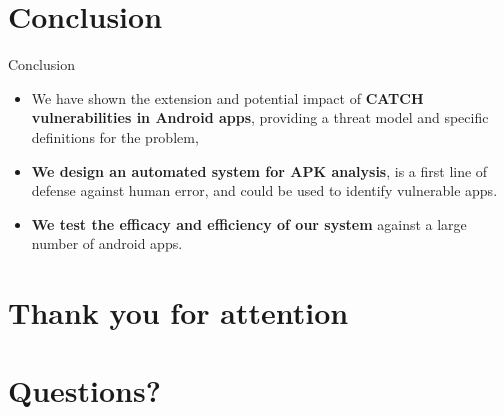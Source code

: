 \documentclass[10pt]{beamer}
\begin{document}
\section{Conclusion}
\begin{frame}[fragile]{Conclusion}
  
  \begin{itemize}
    
  \item We have shown the extension and potential impact of {\bf CATCH
      vulnerabilities in Android apps}, providing a threat model and
    specific definitions for the problem,

  \item {\bf We design an automated system for APK analysis}, is a
    first line of defense against human error, and could be used to
    identify vulnerable apps.

  \item {\bf We test the efficacy and efficiency of our system}
    against a large number of android apps.
  
\end{itemize}
\end{frame}

\section*{Thank you for attention}

\section*{Questions?}
\end{document}
